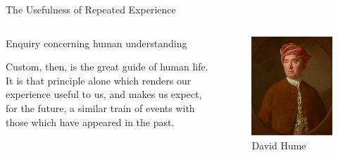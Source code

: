 \documentclass[aspectratio=1610, english]{beamer}
\begin{document}
\begin{frame}{The Usefulness of Repeated Experience}
  \begin{columns}[T] %
    \begin{column}{0.6\textwidth}
        \begin{block}{Enquiry concerning human understanding}
              \begin{displayquote}
                Custom, then, is the great guide of human life. It is that principle alone which renders our experience useful to us, and makes us expect, for the future, a similar train of events with those which have appeared in the past. \cite{hume2016enquiry}
              \end{displayquote}   
        \end{block}
    \end{column}
    \begin{column}{0.4\textwidth}
      \begin{figure}
        \centering
        \includegraphics[width=\linewidth]{img/Painting_of_David_Hume.jpg}
        \caption{David Hume}
        \label{fig:david-hume-painting}
      \end{figure}
    \end{column}
  \end{columns}
\end{frame}
\end{document}
